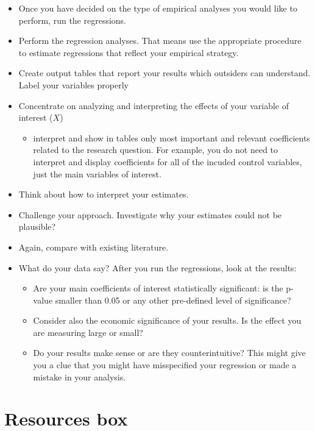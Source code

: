 \documentclass[
]{book}
\providecommand{\tightlist}{%
  \setlength{\itemsep}{0pt}\setlength{\parskip}{0pt}}
\begin{document}
\begin{itemize}
\item
  Once you have decided on the type of empirical analyses you would like
  to perform, run the regressions.
\item
  Perform the regression analyses. That means use the appropriate
  procedure to estimate regressions that reflect your empirical
  strategy.
\item
  Create output tables that report your results which outsiders can
  understand. Label your variables properly
\item
  Concentrate on analyzing and interpreting the effects of your variable
  of interest (\(X\))

  \begin{itemize}
  \tightlist
  \item
    interpret and show in tables only most important and relevant
    coefficients related to the research question. For example, you do
    not need to interpret and display coefficients for all of the
    incuded control variables, just the main variables of interest.
  \end{itemize}
\item
  Think about how to interpret your estimates.
\item
  Challenge your approach. Investigate why your estimates could not be
  plausible?
\item
  Again, compare with existing literature.
\item
  What do your data say? After you run the regressions, look at the
  results:

  \begin{itemize}
  \tightlist
  \item
    Are your main coefficients of interest statistically significant: is
    the p-value smaller than 0.05 or any other pre-defined level of
    significance?
  \item
    Consider also the economic significance of your results. Is the
    effect you are measuring large or small?
  \item
    Do your results make sense or are they counterintuitive? This might
    give you a clue that you might have misspecified your regression or
    made a mistake in your analysis.
  \end{itemize}
\end{itemize}

\hypertarget{resources-box-4}{%
\section{Resources box}\label{resources-box-4}}
\end{document}
